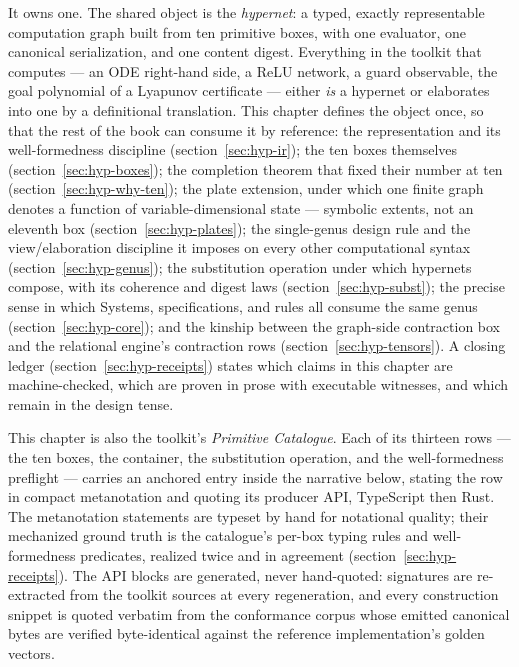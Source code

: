 It owns one. The shared object is the \emph{hypernet}: a typed,
exactly representable computation graph built from ten primitive
boxes, with one evaluator, one canonical serialization, and one
content digest. Everything in the toolkit that computes --- an ODE
right-hand side, a ReLU network, a guard observable, the goal
polynomial of a Lyapunov certificate --- either \emph{is} a hypernet
or elaborates into one by a definitional translation. This chapter
defines the object once, so that the rest of the book can consume it by
reference: the representation and its well-formedness discipline
(section~\ref{sec:hyp-ir}); the ten boxes themselves
(section~\ref{sec:hyp-boxes}); the completion theorem that fixed their
number at ten (section~\ref{sec:hyp-why-ten}); the plate extension,
under which one finite graph denotes a function of
variable-dimensional state --- symbolic extents, not an eleventh box
(section~\ref{sec:hyp-plates}); the single-genus design
rule and the view/elaboration discipline it imposes on every other
computational syntax (section~\ref{sec:hyp-genus}); the substitution
operation under which hypernets compose, with its coherence and
digest laws (section~\ref{sec:hyp-subst}); the precise sense in which
Systems, specifications, and rules all consume the same genus
(section~\ref{sec:hyp-core}); and the kinship between the graph-side
contraction box and the relational engine's contraction rows
(section~\ref{sec:hyp-tensors}). A closing ledger
(section~\ref{sec:hyp-receipts}) states which claims in this chapter
are machine-checked, which are proven in prose with executable
witnesses, and which remain in the design tense.

This chapter is also the toolkit's \emph{Primitive Catalogue}. Each of
its thirteen rows --- the ten boxes, the container, the substitution
operation, and the well-formedness preflight --- carries an anchored
entry inside the narrative below, stating the row in compact
metanotation and quoting its producer API, TypeScript then Rust. The
metanotation statements are typeset by hand for notational quality;
their mechanized ground truth is the catalogue's per-box typing rules
and well-formedness predicates, realized twice and in agreement
(section~\ref{sec:hyp-receipts}). The API blocks are generated, never
hand-quoted: signatures are re-extracted from the toolkit sources at
every regeneration, and every construction snippet is quoted verbatim
from the conformance corpus whose emitted canonical bytes are verified
byte-identical against the reference implementation's golden vectors.

